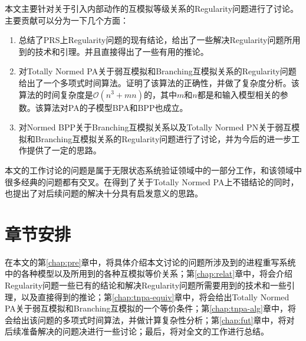 本文主要针对关于引入内部动作的互模拟等级关系的Regularity问题进行了讨论。主要贡献可以分为一下几个方面：

\begin{enumerate}
	\item 总结了PRS上Regularity问题的现有结论，给出了一些解决Regularity问题所用到的技术和引理。并且直接得出了一些有用的推论。
	\item 对Totally Normed PA关于弱互模拟和Branching互模拟关系的Regularity问题给出了一个多项式时间算法。证明了该算法的正确性，并做了复杂度分析。该算法的时间复杂度是$\mathscr{O}(n^3+mn)$的，其中$m$和$n$都是和输入模型相关的参数。该算法对PA的子模型BPA和BPP也成立。
	\item 对Normed BPP关于Branching互模拟关系以及Totally Normed PN关于弱互模拟和Branching互模拟关系的Regularity问题进行了讨论，并为今后的进一步工作提供了一定的思路。
\end{enumerate}

本文的工作讨论的问题是属于无限状态系统验证领域中的一部分工作，和该领域中很多经典的问题都有交叉。在得到了关于Totally Normed PA上不错结论的同时，也提出了对后续问题的解决十分具有启发意义的思路。

\section{章节安排}
\label{sec:section}

在本文的第\ref{chap:pre}章中，将具体介绍本文讨论的问题所涉及到的进程重写系统中的各种模型以及所用到的各种互模拟等价关系；第\ref{chap:relat}章中，将会介绍Regularity问题一些已有的结论和解决Regularity问题所需要用到的技术和一些引理，以及直接得到的推论；第\ref{chap:tnpa-equiv}章中，将会给出Totally Normed PA关于弱互模拟和Branching互模拟的一个等价条件；第\ref{chap:tnpa-alg}章中，将会给出该问题的多项式时间算法，并做计算复杂性分析；第\ref{chap:fut}章中，将对后续准备解决的问题决进行一些讨论；最后，将对全文的工作进行总结。
